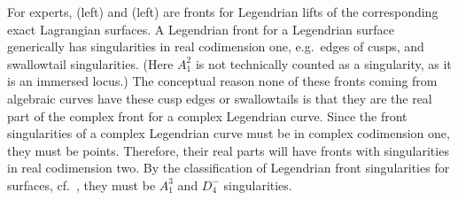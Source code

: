 \begin{remark}\label{rmk:front_of_lift}
For experts,  (left) and  (left) are fronts for Legendrian lifts of the corresponding exact Lagrangian surfaces. A Legendrian front for a Legendrian surface generically has singularities in real codimension one, e.g.~edges of cusps, and swallowtail singularities. (Here $A_1^2$ is not technically counted as a singularity, as it is an immersed locus.) The conceptual reason none of these fronts coming from algebraic curves have these cusp edges or swallowtails is that they are the real part of the complex front for a complex Legendrian curve. Since the front singularities of a complex Legendrian curve must be in complex codimension one, they must be points. Therefore, their real parts will have fronts with singularities in real codimension two. By the classification of Legendrian front singularities for surfaces, cf.~\cite[Chapter 21]{ArnoldGuseinZadeVarchenko85_Vol1}, they must be $A_1^3$ and $D_4^-$ singularities.\sbs
\end{remark}